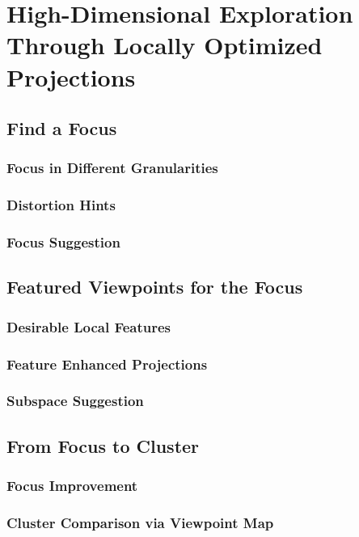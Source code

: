 \section{High-Dimensional Exploration Through Locally Optimized Projections}
\label{section:method}
\subsection{Find a Focus}
\subsubsection{Focus in Different Granularities}
\subsubsection{Distortion Hints}
\subsubsection{Focus Suggestion}
\subsection{Featured Viewpoints for the Focus}
\subsubsection{Desirable Local Features}
\subsubsection{Feature Enhanced Projections}
\subsubsection{Subspace Suggestion}
\subsection{From Focus to Cluster}
\subsubsection{Focus Improvement}
\subsubsection{Cluster Comparison via Viewpoint Map}
